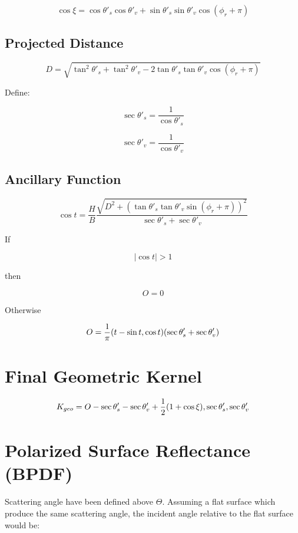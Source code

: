 \documentclass[
  11pt,
  letterpaper,
  DIV=11,
  numbers=noendperiod]{scrreprt}
\begin{document}
\[
\cos\xi =
\cos\theta'_s\cos\theta'_v +
\sin\theta'_s\sin\theta'_v\cos(\phi_r+\pi)
\]

\subsection{Projected Distance}\label{projected-distance}

\[
D =
\sqrt{
\tan^2\theta'_s +
\tan^2\theta'_v -
2\tan\theta'_s\tan\theta'_v\cos(\phi_r+\pi)
}
\]

Define:

\[
\sec\theta'_s = \frac{1}{\cos\theta'_s}
\]

\[
\sec\theta'_v = \frac{1}{\cos\theta'_v}
\]

\subsection{\texorpdfstring{Ancillary Function
}{Ancillary Function }}\label{ancillary-function}

\[
\cos t =
\frac{H}{B}\frac{
\sqrt{
D^2 + (\tan\theta'_s\tan\theta'_v\sin(\phi_r+\pi))^2
}}
{\sec\theta'_s + \sec\theta'_v}
\]

If

\[
|\cos t| > 1
\]

then

\[
O = 0
\]

Otherwise

\[
O =
\frac{1}{\pi}(t - \sin t \\, \cos t)
(\sec\theta'_s + \sec\theta'_v)
\]

\section{Final Geometric Kernel}\label{final-geometric-kernel}

\[
K_{geo} = O - \sec\theta'_s - \sec\theta'_v + \frac{1}{2}(1+\cos\xi) \\, \sec\theta'_s \\,  \sec\theta'_v
\]

\section{Polarized Surface Reflectance
(BPDF)}\label{polarized-surface-reflectance-bpdf}

Scattering angle have been defined above \(\Theta\). Assuming a flat
surface which produce the same scattering angle, the incident angle
relative to the flat surface would be:
\end{document}
